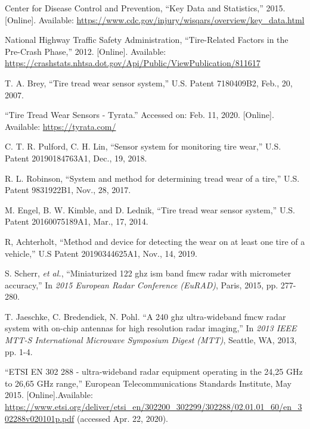 \documentclass[11pt]{IEEEtran}
\begin{document}
	\begin{thebibliography}{00}
			 Center for Disease Control and Prevention, ``Key Data and Statistics,'' 2015. [Online]. Available: \url{https://www.cdc.gov/injury/wisqars/overview/key_data.html}

			 National Highway Traffic Safety Administration, ``Tire-Related Factors in the Pre-Crash Phase,'' 2012. [Online]. Available: \url{https://crashstats.nhtsa.dot.gov/Api/Public/ViewPublication/811617}


		
			 T. A. Brey, ``Tire tread wear sensor system,'' U.S. Patent 7180409B2, Feb., 20, 2007.
			
			 ``Tire Tread Wear Sensors - Tyrata.'' Accessed on: Feb. 11, 2020. [Online]. Available: \url{https://tyrata.com/}
			
			 C. T. R. Pulford, C. H. Lin, ``Sensor system for monitoring tire wear,'' U.S. Patent 20190184763A1, Dec., 19, 2018.
			
			 R. L. Robinson, ``System and method for determining tread wear of a tire,'' U.S. Patent 9831922B1, Nov., 28, 2017.
			
			 M. Engel, B. W. Kimble, and D. Lednik, ``Tire tread wear sensor system,'' U.S. Patent 20160075189A1, Mar., 17, 2014.
			
			 R, Achterholt, ``Method and device for detecting the wear on at least one tire of a vehicle,'' U.S Patent 20190344625A1, Nov., 14, 2019.


				 S. Scherr, \textit{et al.}, ``Miniaturized 122 ghz ism band fmcw radar with micrometer accuracy,'' In \textit{2015 European Radar Conference (EuRAD)}, Paris, 2015, pp. 277-280.

				 T. Jaeschke, C. Bredendiek, N. Pohl. ``A 240 ghz ultra-wideband fmcw radar system with on-chip antennas for high resolution radar imaging,'' In \textit{2013 IEEE MTT-S International Microwave Symposium Digest (MTT)}, Seattle, WA, 2013, pp. 1-4.
    	

			 ``ETSI EN 302 288 - ultra-wideband radar equipment operating in the 24,25 GHz to 26,65 GHz range,'' European Telecommunications Standards Institute, May 2015. [Online].Available: \url{https://www.etsi.org/deliver/etsi_en/302200_302299/302288/02.01.01_60/en_302288v020101p.pdf} (accessed Apr. 22, 2020).


\end{thebibliography}
\end{document}
